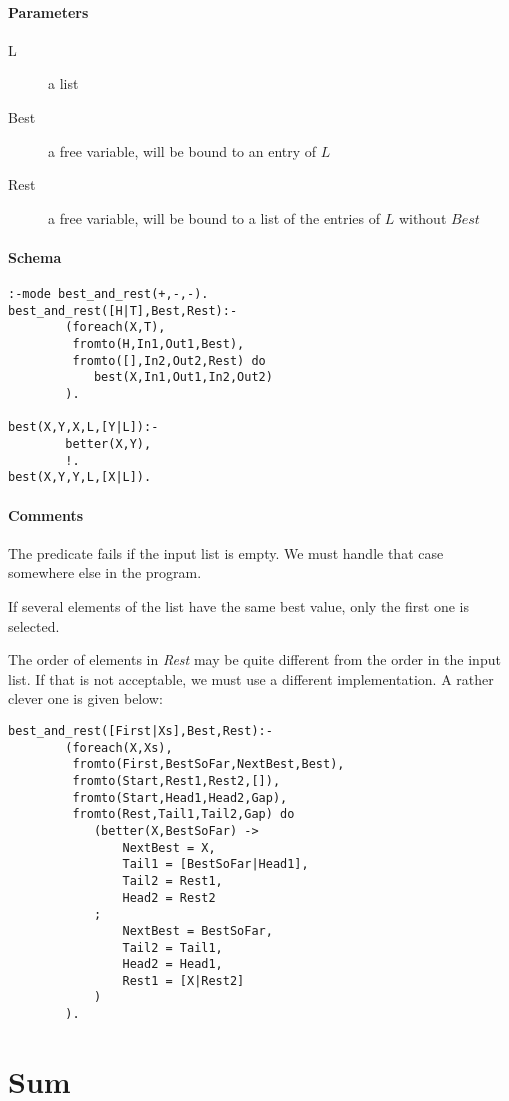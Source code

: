 \documentclass[a4paper,12pt]{report}
\begin{document}
\paragraph{Parameters}
\begin{description}
\item[L] a list
\item[Best] a free variable, will be bound to an entry of $L$
\item[Rest] a free variable, will be bound to a list of the entries of $L$ without $Best$
\end{description}
\paragraph{Schema}
\begin{verbatim}
:-mode best_and_rest(+,-,-).
best_and_rest([H|T],Best,Rest):-
        (foreach(X,T),
         fromto(H,In1,Out1,Best),
         fromto([],In2,Out2,Rest) do
            best(X,In1,Out1,In2,Out2)
        ).

best(X,Y,X,L,[Y|L]):-
        better(X,Y),
        !.
best(X,Y,Y,L,[X|L]).
\end{verbatim}
\paragraph{Comments}
The predicate fails if the input list is empty. We must handle that case somewhere else in the program.

If several elements of the list have the same best value, only the first one is selected. 

The order of elements in {\it Rest} may be quite different from the order in the input list. If that is not acceptable, we must use a different implementation. A rather clever one is given below:
\pagebreak
\begin{verbatim}
best_and_rest([First|Xs],Best,Rest):-
        (foreach(X,Xs),
         fromto(First,BestSoFar,NextBest,Best),
         fromto(Start,Rest1,Rest2,[]),
         fromto(Start,Head1,Head2,Gap),
         fromto(Rest,Tail1,Tail2,Gap) do
            (better(X,BestSoFar) ->
                NextBest = X,
                Tail1 = [BestSoFar|Head1],
                Tail2 = Rest1,
                Head2 = Rest2
            ;
                NextBest = BestSoFar,
                Tail2 = Tail1,
                Head2 = Head1,
                Rest1 = [X|Rest2]
            )
        ).
\end{verbatim}
\pagebreak
\section{Sum}
\end{document}

